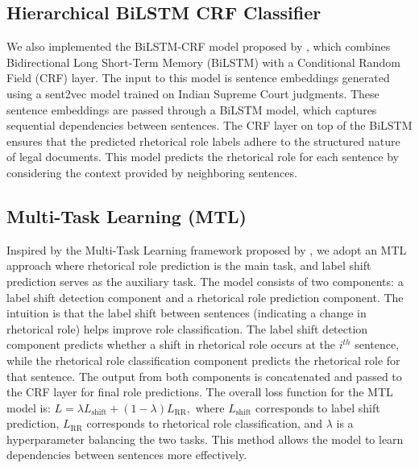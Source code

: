 \subsection{Hierarchical BiLSTM CRF Classifier}
We also implemented the BiLSTM-CRF model proposed by \citet{bhattacharya2019identification}, which combines Bidirectional Long Short-Term Memory (BiLSTM) with a Conditional Random Field (CRF) layer. The input to this model is sentence embeddings generated using a sent2vec model trained on Indian Supreme Court judgments. These sentence embeddings are passed through a BiLSTM model, which captures sequential dependencies between sentences. The CRF layer on top of the BiLSTM ensures that the predicted rhetorical role labels adhere to the structured nature of legal documents. This model predicts the rhetorical role for each sentence by considering the context provided by neighboring sentences.

\subsection{Multi-Task Learning (MTL)}
Inspired by the Multi-Task Learning framework proposed by \citet{malik-etal-2022-semantic}, we adopt an MTL approach where rhetorical role prediction is the main task, and label shift prediction serves as the auxiliary task. The model consists of two components: a label shift detection component and a rhetorical role prediction component. The intuition is that the label shift between sentences (indicating a change in rhetorical role) helps improve role classification. The label shift detection component predicts whether a shift in rhetorical role occurs at the \(i^{th}\) sentence, while the rhetorical role classification component predicts the rhetorical role for that sentence. The output from both components is concatenated and passed to the CRF layer for final role predictions. The overall loss function for the MTL model is:
$L = \lambda L_{\text{shift}} + (1-\lambda) L_{\text{RR}},$
where \(L_{\text{shift}}\) corresponds to label shift prediction, \(L_{\text{RR}}\) corresponds to rhetorical role classification, and \(\lambda\) is a hyperparameter balancing the two tasks. This method allows the model to learn dependencies between sentences more effectively.

